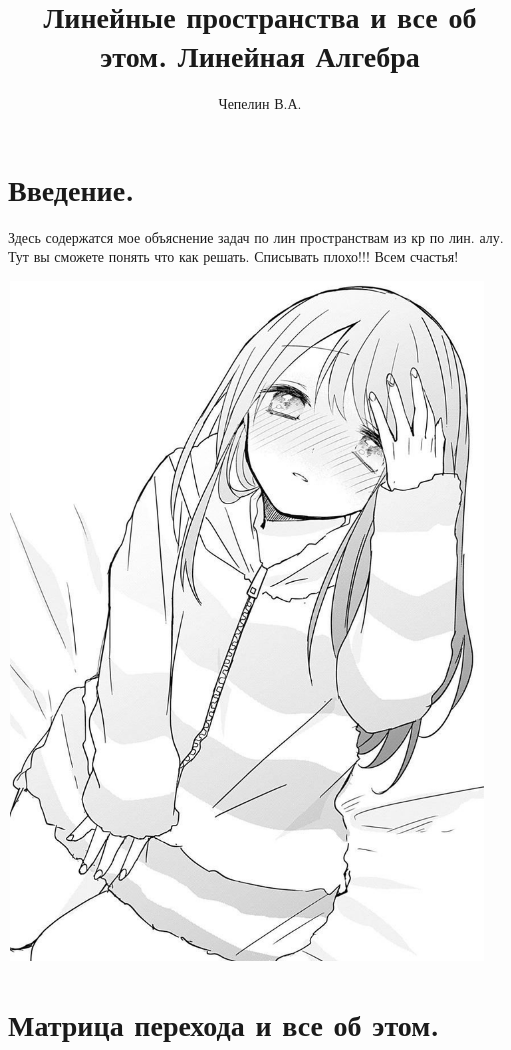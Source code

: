 \documentclass{article}
\title{Линейные пространства и все об этом. Линейная Алгебра}
\author{Чепелин В.А.}
\date{}
\begin{document}
\maketitle
\tableofcontents
\pagebreak
\section{Введение.}

 Здесь содержатся мое объяснение задач по лин пространствам из  кр по лин. алу. Тут вы сможете понять что как решать. Списывать плохо!!! Всем счастья!
\begin{center}
   \includegraphics[width=12.65cm, height=18cm]{аниме.jpg}
\end{center}

\section{Матрица перехода и все об этом.}
\end{document}
